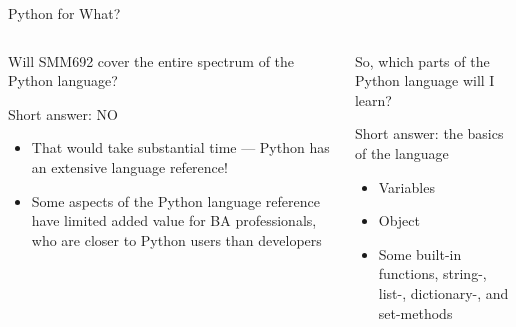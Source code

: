 \documentclass[aspectratio=1610]{beamer}
\begin{document}
\begin{frame}[t]{Python for What?}
\begin{columns}[t]
	\begin{column}{0.5\textwidth}
		\textcolor{tri_1}{Will SMM692 cover the entire spectrum of the Python language?}

		\vspace{1em}

		\textcolor{tri_1}{Short answer: NO}

		\vspace{1em}

		\begin{itemize}
			\item That would take substantial time --- Python has an extensive language reference!
			\item Some aspects of the Python language reference have limited added value for BA professionals, who are closer to Python users than developers
		\end{itemize}
	\end{column}
	\begin{column}{0.5\textwidth}
		\textcolor{tri_2}{So, which parts of the Python language will I learn?}

		\vspace{1em}

		\textcolor{tri_2}{Short answer: the basics of the language}

		\vspace{1em}

		\begin{itemize}
			\item Variables
			\item Object
			\item Some built-in functions, string-, list-, dictionary-, and set-methods
		\end{itemize}
	\end{column}
\end{columns}
\end{frame}
\end{document}
